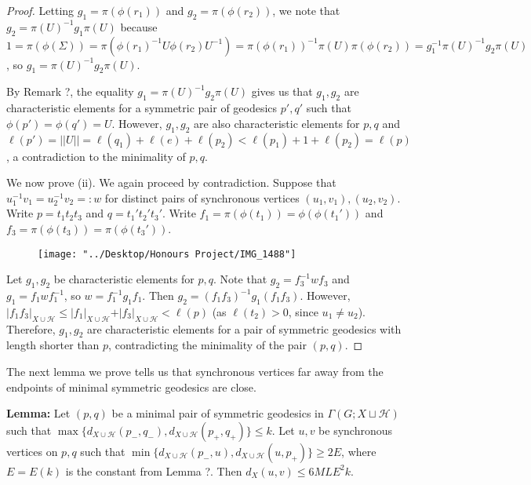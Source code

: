 \documentclass[12pt]{article}
\newcommand{\vs}{\vskip10pt}
\begin{document}
\begin{proof}
		\vs 
		
		Letting $g_1 = \pi(\phi(r_1))$ and $g_2 = \pi(\phi(r_2))$, we note that $g_2 = \pi(U)^{-1} g_1 \pi(U)$ because $1 = \pi(\phi(\Sigma)) = \pi(\phi(r_1)^{-1} U \phi(r_2) U^{-1}) = \pi(\phi(r_1))^{-1} \pi(U) \pi(\phi(r_2)) = g_1^{-1} \pi(U)^{-1} g_2 \pi(U)$, so $g_1 = \pi(U)^{-1} g_2 \pi(U)$. 
		
		\vs 
		
		By Remark ?, the equality $g_1 = \pi(U)^{-1} g_2 \pi(U)$ gives us that $g_1, g_2$ are characteristic elements for a symmetric pair of geodesics $p', q'$ such that $\phi(p') = \phi(q') = U$. However, $g_1, g_2$ are also characteristic elements for $p,q$ and $\ell(p') = \vert \vert U \vert \vert = \ell(q_1) + \ell(e) + \ell(p_2) < \ell(p_1) + 1 + \ell(p_2) = \ell(p)$, a contradiction to the minimality of $p,q$. 
		
		\vs 
		
		We now prove (ii). We again proceed by contradiction. Suppose that $u_1^{-1} v_1 = u_2^{-1} v_2 =: w$ for distinct pairs of synchronous vertices $(u_1, v_1), (u_2, v_2)$. Write $p = t_1 t_2 t_3$ and $q = t_1' t_2' t_3'$. Write $f_1 = \pi(\phi(t_1)) = \phi(\phi(t_1'))$ and $f_3 = \pi(\phi(t_3)) = \pi(\phi(t_3'))$. 
		
\begin{figure}
	\centering
	\texttt{[image: "../Desktop/Honours Project/IMG\_1488"]}
	\caption{}
	\label{fig:img1488}
\end{figure}

		\vs 
		
		Let $g_1, g_2$ be characteristic elements for $p,q$. Note that $g_2  = f_3^{-1} w f_3$ and $g_1 = f_1 w f_1^{-1}$, so $w = f_1^{-1} g_1 f_1$. Then $g_2 = (f_1 f_3)^{-1} g_1 (f_1 f_3)$. However, $\vert f_1 f_3 \vert_{X \cup \mathcal{H}} \leq \vert f_1 \vert_{X \cup \mathcal{H}} + \vert f_3 \vert_{X \cup \mathcal{H}} < \ell(p)$ (as $\ell(t_2) > 0$, since $u_1 \neq u_2$). Therefore, $g_1, g_2$ are characteristic elements for a pair of symmetric geodesics with length shorter than $p$, contradicting the minimality of the pair $(p,q)$.   
		
	\end{proof}
	
	The next lemma we prove tells us that synchronous vertices far away from the endpoints of minimal symmetric geodesics are close. 
	
	\vs 
	
	\textbf{Lemma: } Let $(p,q)$ be a minimal pair of symmetric geodesics in $\Gamma(G; X \sqcup \mathcal{H})$ such that $\max\{d_{X \cup \mathcal{H}}(p_{-}, q_{-}), d_{X \cup \mathcal{H}}(p_{+}, q_{+})\} \leq k$. Let $u,v$ be synchronous vertices on $p,q$ such that $\min \{d_{X \cup \mathcal{H}}(p_{-}, u), d_{X \cup \mathcal{H}}(u, p_{+})\} \geq 2 E$, where $E = E(k)$ is the constant from Lemma ?. Then $d_X(u,v) \leq 6 ML E^2 k$. 
	
\end{document}
